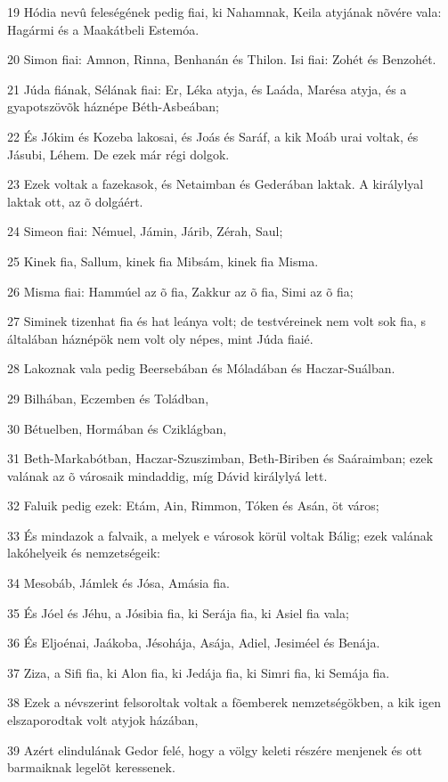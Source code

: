 \par 19 Hódia nevû feleségének pedig fiai, ki Nahamnak, Keila atyjának nõvére vala: Hagármi és a Maakátbeli Estemóa.
\par 20 Simon fiai: Amnon, Rinna, Benhanán és Thilon. Isi fiai: Zohét és Benzohét.
\par 21 Júda fiának, Sélának fiai: Er, Léka atyja, és Laáda, Marésa atyja, és a gyapotszövõk háznépe Béth-Asbeában;
\par 22 És Jókim és Kozeba lakosai, és Joás és Saráf, a kik Moáb urai voltak, és Jásubi, Léhem. De ezek már régi dolgok.
\par 23 Ezek voltak a fazekasok, és Netaimban és Gederában laktak. A királylyal laktak ott, az õ dolgáért.
\par 24 Simeon fiai: Némuel, Jámin, Járib, Zérah, Saul;
\par 25 Kinek fia, Sallum, kinek fia Mibsám, kinek fia Misma.
\par 26 Misma fiai: Hammúel az õ fia, Zakkur az õ fia, Simi az õ fia;
\par 27 Siminek tizenhat fia és hat leánya volt; de testvéreinek nem volt sok fia, s általában háznépök nem volt oly népes, mint Júda fiaié.
\par 28 Lakoznak vala pedig Beersebában és Móladában és Haczar-Suálban.
\par 29 Bilhában, Eczemben és Toládban,
\par 30 Bétuelben, Hormában és Cziklágban,
\par 31 Beth-Markabótban, Haczar-Szuszimban, Beth-Biriben és Saáraimban; ezek valának az õ városaik mindaddig, míg Dávid királylyá lett.
\par 32 Faluik pedig ezek: Etám, Ain, Rimmon, Tóken és Asán, öt város;
\par 33 És mindazok a falvaik, a melyek e városok körül voltak Bálig; ezek valának lakóhelyeik és nemzetségeik:
\par 34 Mesobáb, Jámlek és Jósa, Amásia fia.
\par 35 És Jóel és Jéhu, a Jósibia fia, ki Serája fia, ki Asiel fia vala;
\par 36 És Eljoénai, Jaákoba, Jésohája, Asája, Adiel, Jesiméel és Benája.
\par 37 Ziza, a Sifi fia, ki Alon fia, ki Jedája fia, ki Simri fia, ki Semája fia.
\par 38 Ezek a névszerint felsoroltak voltak a fõemberek nemzetségökben, a kik igen elszaporodtak volt atyjok házában,
\par 39 Azért elindulának Gedor felé, hogy a völgy keleti részére menjenek és ott barmaiknak legelõt keressenek.
